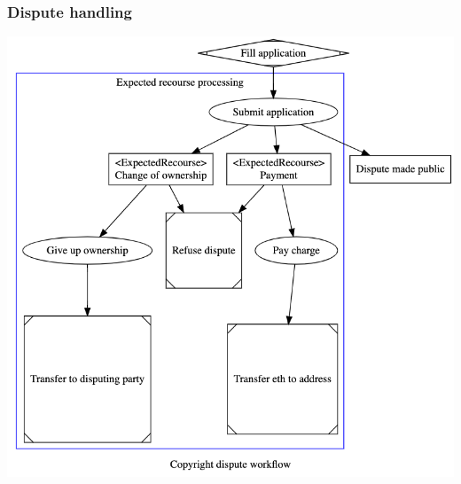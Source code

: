 \documentclass[12pt]{article}
\begin{document}
\subsubsection{Dispute handling}
\includegraphics[width=\textwidth,height=\textheight,keepaspectratio]{images/operational/dispute-workflow}
\end{document}
